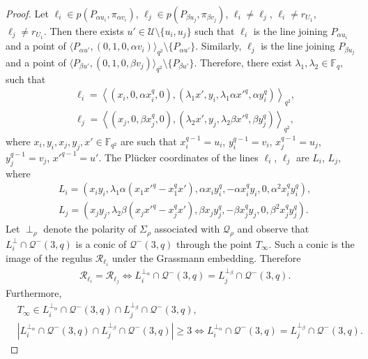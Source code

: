 \documentclass[11pt]{article}
\theoremstyle{definition}
\numberwithin{equation}{section}
\def\cQ{\mathcal Q}
\def\cU{\mathcal U}
\def\cR{\mathcal R}
\def\F{{\mathbb F}}
\begin{document}
\begin{proof}
Let $\ell_i \in p\left( P_{\alpha u_i}, \pi_{\alpha v_i} \right)$, $\ell_j \in p\left( P_{\beta u_{j}}, \pi_{\beta v_{j}} \right)$, $\ell_i \ne \ell_j$, $\ell_i \ne r_{U_1}$, $\ell_j \ne r_{U_1}$. Then there exists $u' \in \cU \setminus \{u_i, u_{j}\}$ such that $\ell_i$ is the line joining $P_{\alpha u_i}$ and a point of $\langle P_{\alpha u'}, (0,1,0, \alpha v_i) \rangle_{q^2} \setminus \{P_{\alpha u'}\}$. Similarly, $\ell_j$ is the line joining $P_{\beta u_j}$ and a point of $\langle P_{\beta u'}, (0,1,0, \beta v_j) \rangle_{q^2} \setminus \{P_{\beta u'}\}$. Therefore, there exist $\lambda_1, \lambda_2 \in \F_q$, such that 
\begin{align*}
& \ell_i = \left\langle \left(x_i, 0, \alpha x_i^q, 0 \right), \left(\lambda_1 x', y_i, \lambda_1 \alpha x'^q, \alpha y_i^q \right) \right\rangle_{q^2}, \\
& \ell_j = \left\langle \left(x_{j}, 0, \beta x_{j}^q, 0 \right), \left(\lambda_2 x', y_{j}, \lambda_2 \beta x'^q, \beta y_{j}^q \right) \right\rangle_{q^2}, 
\end{align*}
where $x_i, y_i, x_{j}, y_{j}, x' \in \F_{q^2}$ are such that $x_i^{q-1} = u_i$, $y_i^{q-1} = v_i$, $x_{j}^{q-1} = u_{j}$, $y_{j}^{q-1} = v_{j}$, $x'^{q-1} = u'$. The Pl\"ucker coordinates of the lines $\ell_i$, $\ell_j$ are $L_i$, $L_{j}$, where
\begin{align*}
& L_i = \left( x_i y_i, \lambda_1 \alpha \left(x_1 x'^q - x_1^q x'\right), \alpha x_i y_i^q, - \alpha x_i^q y_i, 0, \alpha^2 x_i^q y_i^q \right), \\
& L_{j} = \left( x_{j} y_{j}, \lambda_2 \beta \left(x_{j} x'^q - x_{j}^q x'\right), \beta x_{j} y_{j}^q, - \beta x_{j}^q y_{j}, 0, \beta^2 x_{j}^q y_{j}^q \right).
\end{align*}
Let $\perp_{\rho}$ denote the polarity of $\Sigma_{\rho}$ associated with $\cQ_{\rho}$ and observe that $L_i^\perp \cap \cQ^-(3, q)$ is a conic of $\cQ^-(3, q)$ through the point $T_\infty$. Such a conic is the image of the regulus $\cR_{\ell_i}$ under the Grassmann embedding. Therefore  
\begin{align*}
& \cR_{\ell_i} = \cR_{\ell_j} \iff L_i^{\perp_{\alpha}} \cap \cQ^-(3, q) = L_{j}^{\perp_{\beta}} \cap \cQ^-(3, q).
\end{align*}
Furthermore,
\begin{align*}
& T_\infty \in L_i^{\perp_{\alpha}} \cap \cQ^-(3, q) \cap L_{j}^{\perp_{\beta}} \cap \cQ^-(3, q), \\
& |L_i^{\perp_{\alpha}} \cap \cQ^-(3, q) \cap L_{j}^{\perp_{\beta}} \cap \cQ^-(3, q)| \ge 3 \iff L_i^{\perp_{\alpha}} \cap \cQ^-(3, q) = L_{j}^{\perp_{\beta}} \cap \cQ^-(3, q).

\end{align*}
\end{proof}
\end{document}
